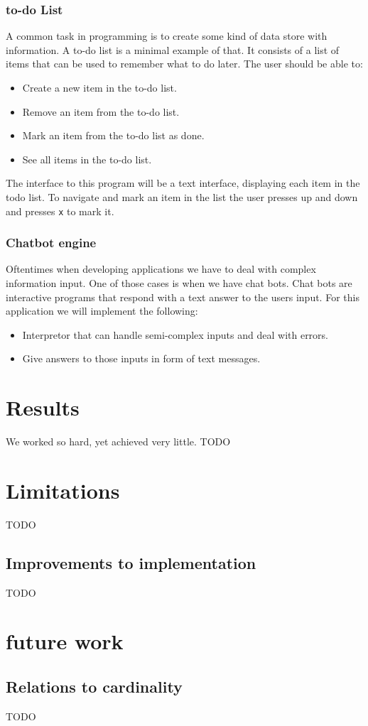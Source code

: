 \documentclass[12pt]{article}
\theoremstyle{definition}
\theoremstyle{theorem}
\begin{document}
\subsubsection{to-do List}

A common task in programming is to create some kind of data store with
information. A to-do list is a minimal example of that. It consists of a list of
items that can be used to remember what to do later. The user should be able to:

\begin{itemize}
    \item Create a new item in the to-do list.
    \item Remove an item from the to-do list.
    \item Mark an item from the to-do list as done.
    \item See all items in the to-do list.
\end{itemize}

The interface to this program will be a text interface, displaying each item in
the todo list. To navigate and mark an item in the list the user presses up and
down and presses \texttt{x} to mark it.

\subsubsection{Chatbot engine}

Oftentimes when developing applications we have to deal with complex information
input. One of those cases is when we have chat bots. Chat bots are interactive
programs that respond with a text answer to the users input. For this
application we will implement the following:

\begin{itemize}
    \item Interpretor that can handle semi-complex inputs and deal with errors.
    \item Give answers to those inputs in form of text messages.
\end{itemize}    

\section{Results}\label{results}
We worked so hard, yet achieved very little. TODO

\section{Limitations}\label{limitations}

TODO

\subsection{Improvements to implementation}
TODO

\section{future work}
\subsection{Relations to cardinality}
TODO



\end{document}
